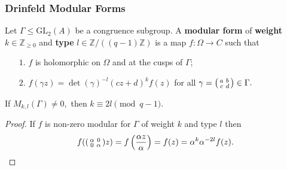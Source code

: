 \documentclass[handout]{beamer}
\numberwithin{equation}{section}
\numberwithin{case}{theorem}
\newcommand{\bbZ}{\mathbb{Z}}		%
\newcommand{\GL}{\mathrm{GL}} 	%
\newcommand{\<}{\left\langle}
\renewcommand{\>}{\right\rangle}
\begin{document}
	\begin{frame}
		\frametitle{Drinfeld Modular Forms}
		\begin{definition}%
			Let $\Gamma\leq \GL_2(A)$ be a congruence subgroup. A \textbf{modular form} of \textbf{weight} $k\in \bbZ_{\geq0}$ and \textbf{type} $l\in \bbZ/((q-1) \bbZ)$ is a map $f:\Omega\to C$ such that\pause 
			\begin{itemize}
				\item[$1.$] $f$ is holomorphic on $\Omega$ and at the cusps of $\Gamma$; \pause
				\item[$2.$] $f(\gamma z)=\det(\gamma)^{-l}(cz+d)^kf(z)$ for all $\gamma=\begin{psmallmatrix}a&b\\c&d\end{psmallmatrix}\in \Gamma.$
			\end{itemize}
		\end{definition}
		
		\pause
		\begin{lemma}\label{l: weight-type}
			If $M_{k,l}(\Gamma)\neq 0,$ then $k\equiv 2l\pmod{q-1}.$
		\end{lemma}
		\pause
		\begin{proof}
			If $f$ is non-zero modular for $\Gamma$ of weight $k$ and type $l$ then \[f(\begin{psmallmatrix}\alpha&0\\0&\alpha\end{psmallmatrix}z)=f\left(\frac{\alpha z}{\alpha}\right)=f(z)=\alpha^k\alpha^{-2l}f(z).\]
		\end{proof}
	\end{frame}
	
\end{document}
